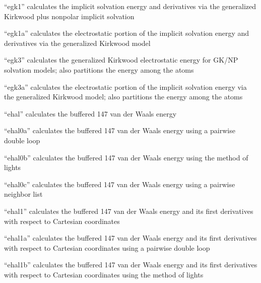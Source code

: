 \documentclass[letterpaper,11pt,english]{sphinxmanual}
\begin{document}

“egk1” calculates the implicit solvation energy and derivatives
via the generalized Kirkwood plus nonpolar implicit solvation


“egk1a” calculates the electrostatic portion of the implicit
solvation energy and derivatives via the generalized Kirkwood
model


“egk3” calculates the generalized Kirkwood electrostatic
energy for GK/NP solvation models; also partitions the
energy among the atoms


“egk3a” calculates the electrostatic portion of the implicit
solvation energy via the generalized Kirkwood model; also
partitions the energy among the atoms


“ehal” calculates the buffered 14\sphinxhyphen{}7 van der Waals energy


“ehal0a” calculates the buffered 14\sphinxhyphen{}7 van der Waals energy
using a pairwise double loop


“ehal0b” calculates the buffered 14\sphinxhyphen{}7 van der Waals energy
using the method of lights


“ehal0c” calculates the buffered 14\sphinxhyphen{}7 van der Waals energy
using a pairwise neighbor list


“ehal1” calculates the buffered 14\sphinxhyphen{}7 van der Waals energy and
its first derivatives with respect to Cartesian coordinates


“ehal1a” calculates the buffered 14\sphinxhyphen{}7 van der Waals energy and
its first derivatives with respect to Cartesian coordinates
using a pairwise double loop


“ehal1b” calculates the buffered 14\sphinxhyphen{}7 van der Waals energy and
its first derivatives with respect to Cartesian coordinates
using the method of lights
\end{document}
